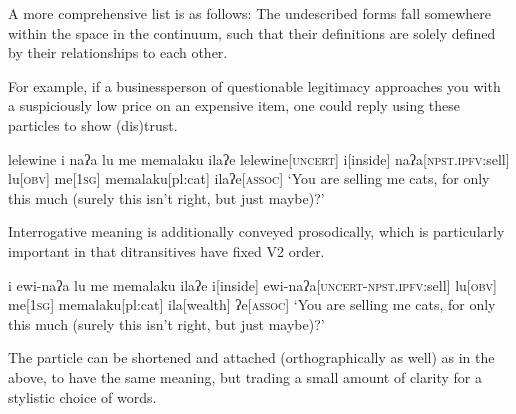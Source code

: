 A more comprehensive list is as follows:  The undescribed forms fall somewhere within the space in the continuum, such that their definitions are solely defined by their relationships to each other.

For example, if a businessperson of questionable legitimacy approaches you with a suspiciously low price on an expensive item, one could reply using these particles to show (dis)trust.

\ex
\begingl
\glpreamble lelewine i naʔa lu me memalaku ilaʔe
\endpreamble
lelewine[\textsc{uncert}]
i[inside]
naʔa[\textsc{npst.ipfv:}sell]
lu[\textsc{obv}]
me[\textsc{1sg}]
memalaku[pl:cat]
ila\footnotemark[wealth]
ʔe[\textsc{assoc}]
\glft `You are selling me cats, for only this much (surely this isn't right, but just maybe)?'
\endgl
\xe

Interrogative meaning is additionally conveyed prosodically, which is particularly important in that ditransitives have fixed V2 order.


\ex
\begingl
\glpreamble i ewi-naʔa lu me memalaku ilaʔe
\endpreamble
i[inside]
ewi-naʔa[\textsc{uncert-npst.ipfv:}sell]
lu[\textsc{obv}]
me[\textsc{1sg}]
memalaku[pl:cat]
ila[wealth]
ʔe[\textsc{assoc}]
\glft `You are selling me cats, for only this much (surely this isn't right, but just maybe)?'
\endgl
\xe

The particle  can be shortened and attached (orthographically as well) as in the above, to have the same meaning, but trading a small amount of clarity for a stylistic choice of words.